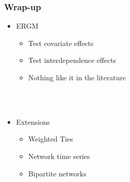 \documentclass[handout]{beamer}
\begin{document}




\begin{frame}
\frametitle{Wrap-up}
\begin{itemize}
\item ERGM
\begin{itemize}
\item Test covariate effects
\item Test interdependence effects
\item Nothing like it in the literature
\end{itemize} ~\\~\\
\item Extensions
\begin{itemize}
\item Weighted Ties
\item Network time series
\item Bipartite networks
\end{itemize}
\end{itemize}
\end{frame}
\end{document}
